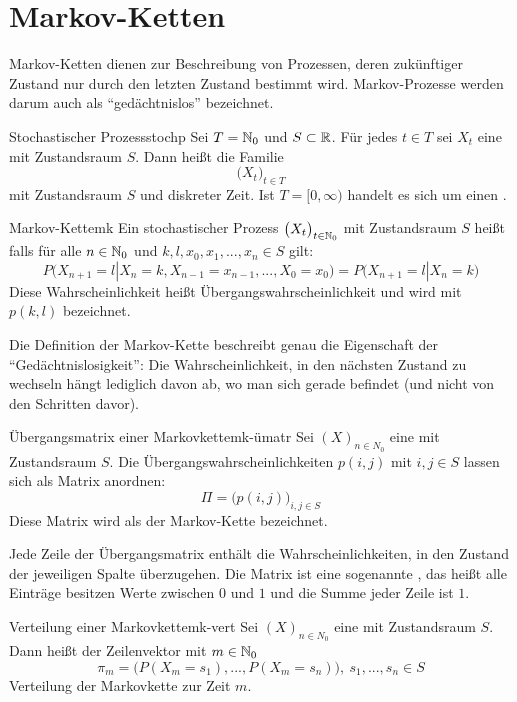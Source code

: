 \chapter{Markov-Ketten}

Markov-Ketten dienen zur Beschreibung von Prozessen, deren zukünftiger Zustand
nur durch den letzten Zustand bestimmt wird. Markov-Prozesse werden darum auch
als "`gedächtnislos"' bezeichnet.

\begin{definition}{Stochastischer Prozess}{stochp}
Sei $T=\mathbb{N}_0$ und $S \subset\mathbb{R}$. Für jedes $t\in T$ sei $X_t$ eine
 mit Zustandsraum $S$. Dann heißt die Familie
\[
\big(X_t\big)_{t\in T}
\]
 mit Zustandsraum $S$ und diskreter Zeit. Ist
$T = [0, \infty)$ handelt es sich um einen .
\end{definition}

\begin{definition}{Markov-Kette}{mk}
Ein stochastischer Prozess $\big(X_t\big)_{t\in \mathbb{N}_0}$ mit Zustandsraum $S$
heißt  falls für alle $n\in\mathbb{N}_0$ und $k,l,x_0,x_1,...,x_n \in S$
gilt:
\[
P\big(X_{n+1} = l | X_{n}=k, X_{n-1}=x_{n-1},...,X_0=x_0\big) =
P\big(X_{n+1}=l|X_n=k\big)
\]
Diese Wahrscheinlichkeit heißt Übergangswahrscheinlichkeit und wird mit $p(k,l)$
bezeichnet.
\end{definition}

Die Definition der Markov-Kette beschreibt genau die Eigenschaft der
"`Gedächtnislosigkeit"': Die Wahrscheinlichkeit, in den nächsten Zustand zu
wechseln hängt lediglich davon ab, wo man sich gerade befindet (und nicht von
den Schritten davor).

\begin{definition}{Übergangsmatrix einer Markovkette}{mk-ümatr}
Sei $(X)_{n\in N_0}$ eine  mit Zustandsraum $S$. Die
Übergangswahrscheinlichkeiten $p(i,j)$ mit $i,j\in S$ lassen sich als Matrix
anordnen:
\[
\Pi = \big(p(i,j)\big)_{i,j\in S}
\]
Diese Matrix wird als  der Markov-Kette bezeichnet.
\end{definition}

Jede Zeile der Übergangsmatrix enthält die Wahrscheinlichkeiten, in den Zustand
der jeweiligen Spalte überzugehen. Die Matrix ist eine sogenannte
, das heißt alle Einträge besitzen Werte zwischen $0$
und $1$ und die Summe jeder Zeile ist $1$.

\begin{definition}{Verteilung einer Markovkette}{mk-vert}
Sei $(X)_{n\in N_0}$ eine  mit Zustandsraum $S$. Dann
heißt der Zeilenvektor mit $m\in \mathbb{N}_0$
\[
\pi_m = \big(P(X_m=s_1), ...,P(X_m=s_n)\big),\ s_1, ..., s_n \in S
\]
Verteilung der Markovkette zur Zeit $m$.
\end{definition}

